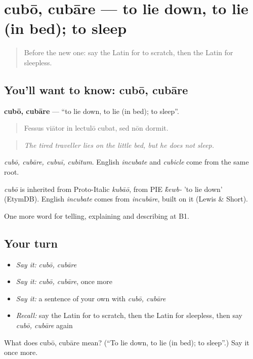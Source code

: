 \section[cubō, cubāre]{cubō, cubāre — to lie down, to lie (in bed); to sleep}

\label{lesson:LA-C447-cubo}



\begin{quote}
Before the new one: say the Latin for to scratch, then the Latin for sleepless.
\end{quote}

\subsection*{You'll want to know: cubō, cubāre}
\textbf{cubō, cubāre} — \textquotedblleft{}to lie down, to lie (in bed); to sleep\textquotedblright{}.

\begin{quote}
Fessus viātor in lectulō cubat, sed nōn dormit.
\end{quote}

\begin{quote}
\emph{The tired traveller lies on the little bed, but he does not sleep.}
\end{quote}

\emph{cubō, cubāre, cubuī, cubitum}. English \emph{incubate} and \emph{cubicle} come from the same root.

\begin{cousinweb}
\emph{cubō} is inherited from Proto-Italic \emph{kubāō}, from PIE \emph{\'{k}ewb-} 'to lie down' (EtymDB). English \emph{incubate} comes from \emph{incubāre}, built on it (Lewis \& Short).
\end{cousinweb}

\begin{grammarlens}[title={What you've built}]
One more word for telling, explaining and describing at B1.
\end{grammarlens}

\subsection*{Your turn}
\begin{itemize}
\raggedright
  \item \emph{Say it:} \emph{cubō, cubāre}
  \item \emph{Say it:} \emph{cubō, cubāre}, once more
  \item \emph{Say it:} a sentence of your own with \emph{cubō, cubāre}
  \item \emph{Recall:} say the Latin for to scratch, then the Latin for sleepless, then say \emph{cubō, cubāre} again
\end{itemize}

\begin{tcolorbox}[breakable,colback=teal!4,colframe=teal!35!black,title={Before you move on}]
What does cubō, cubāre mean? (\textquotedblleft{}To lie down, to lie (in bed); to sleep\textquotedblright{}.) Say it once more.
\end{tcolorbox}
